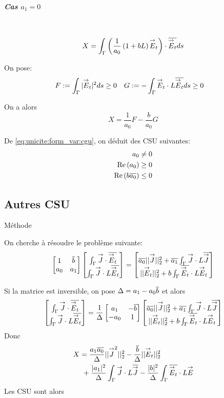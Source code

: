 \subparagraph{Cas $a_1=0$}
~
\[
X = \int_\Gamma \left( \frac{1}{a_0}\left(1+bL\right)\vE_t\right) \cdot \conj{\vE_t} ds
\]

On pose:
\begin{align*}
F&:= \int_\Gamma | \vE_t | ^2 ds \ge 0 & G &:= -\int_\Gamma \vE_t \cdot L\conj{\vE_t} ds \ge 0
\end{align*}

On a alors
\begin{equation}
\label{eq:unicite:form_var:decomp_cgu_ci1_a1_nul}
X = \frac{1}{a_0}F - \frac{b}{a_0}G
\end{equation}

De \eqref{eq:unicite:form_var:cgu}, on déduit des CSU suivantes:
\begin{align}
a_0 \not= 0\\
\Re\left(a_0\right) \ge 0\\
\Re\left(b\conj{a_0}\right) \le 0
\end{align}




\subsection{Autres CSU}
Méthode \cite{stupfel_implementation_2015}

On cherche à résoudre le problème suivante:
\[
\begin{bmatrix}
1 & \conj{b} \\
a_0 & a_1
\end{bmatrix}
\begin{bmatrix}
\int_\Gamma \vJ \cdot \conj{\vE_t} \\
\int_\Gamma \vJ\cdot L\conj{\vE_t}
\end{bmatrix}
=
\begin{bmatrix}
\conj{a_0}||\vJ||_2^2 + \conj{a_1}\int_\Gamma \vJ \cdot L\conj{\vJ} \\
||\vE_t||_2^2 + b\int_\Gamma \conj{\vE_t} \cdot L\vE_t
\end{bmatrix}
\]

Si la matrice est inversible, on pose $\Delta = a_1 - a_0\conj{b}$ et alors
\[
\begin{bmatrix}
\int_\Gamma \vJ \cdot \conj{\vE_t} \\
\int_\Gamma \vJ\cdot L\conj{\vE_t}
\end{bmatrix}
=\frac{1}{\Delta}
\begin{bmatrix}
a_1 & -\conj{b} \\
-a_0 & 1
\end{bmatrix}
\begin{bmatrix}
\conj{a_0}||\vJ||_2^2 + \conj{a_1}\int_\Gamma \vJ \cdot L\conj{\vJ} \\
||\vE_t||_2^2 + b\int_\Gamma \conj{\vE_t} \cdot L\vE_t
\end{bmatrix}
\]
Donc
\begin{align*}
X &=  \frac{a_1\conj{a_0}}{\Delta}||\vJ^2||_2^2 - \frac{\conj{b}}{\Delta}||\vE_t||_2^2 \\
&~+\frac{|a_1|^2}{\Delta}\int_\Gamma\vJ\cdot L \conj{\vJ} - \frac{|b|^2}{\Delta}\int_\Gamma\conj{\vE_t}\cdot L\vE
\end{align*}
Les CSU sont alors


